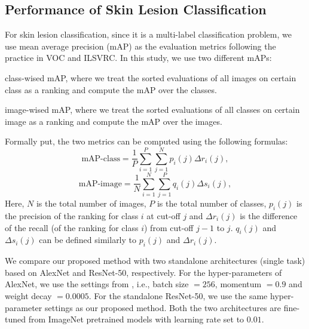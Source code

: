 \documentclass[letterpaper]{article}
\begin{document}
\subsection{Performance of Skin Lesion Classification}

For skin lesion classification, since it is a multi-label classification problem,
we use mean average precision (mAP) as the evaluation metrics following the practice
in VOC \cite{DBLP:journals/ijcv/EveringhamGWWZ10} and ILSVRC. In this study, we
use two different mAPs:
\begin{inparaenum}[1)]
  \item class-wised mAP, where we treat the sorted evaluations of all images on
  certain class as a ranking and compute the mAP over the classes.
  \item image-wised mAP, where we treat the sorted evaluations of all classes on
  certain image as a ranking and compute the mAP over the images.
\end{inparaenum}
Formally put, the two metrics can be computed using the following formulas:
\begin{equation}
  \text{mAP-class} = \frac{1}{P}\sum_{i=1}^P\sum_{j=1}^Np_i(j)\Delta r_i(j),
\end{equation}
\begin{equation}
  \text{mAP-image} = \frac{1}{N}\sum_{i=1}^N\sum_{j=1}^Pq_i(j)\Delta s_i(j),
\end{equation}
Here, $N$ is the total number of images, $P$ is the total number of classes,
$p_i(j)$ is the precision of the ranking for class $i$ at cut-off $j$ and
$\Delta r_i(j)$ is the difference of the recall (of the ranking for class $i$) from
cut-off $j-1$ to $j$. $q_i(j)$ and $\Delta s_i(j)$ can be defined similarly to
$p_i(j)$ and $\Delta r_i(j)$.

We compare our proposed method with two standalone architectures (single task) based
on AlexNet and ResNet-50, respectively. For the hyper-parameters of AlexNet, we use the settings
from \cite{DBLP:conf/nips/KrizhevskySH12}, i.e., batch size $= 256$, momentum $= 0.9$
and weight decay $= 0.0005$. For the standalone ResNet-50, we use the same hyper-parameter
settings as our proposed method. Both the two architectures are fine-tuned from ImageNet
pretrained models with learning rate set to $0.01$.
\end{document}
